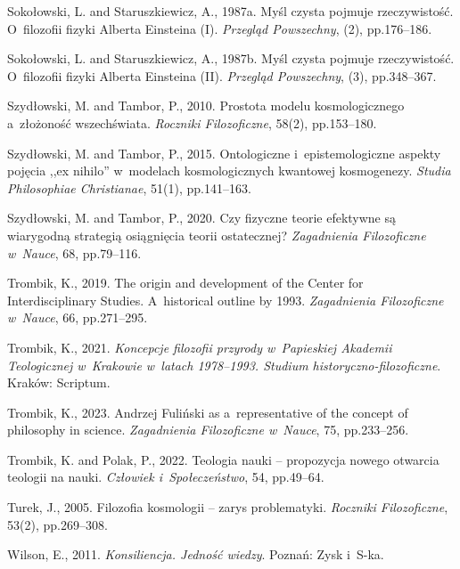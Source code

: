 Sokołowski, L. and Staruszkiewicz, A., 1987a. Myśl czysta pojmuje rzeczywistość. O~filozofii fizyki Alberta Einsteina (I). \textit{Przegląd Powszechny}, (2), pp.176–186.



Sokołowski, L. and Staruszkiewicz, A., 1987b. Myśl czysta pojmuje rzeczywistość. O~filozofii fizyki Alberta Einsteina (II). \textit{Przegląd Powszechny}, (3), pp.348–367.



Szydłowski, M. and Tambor, P., 2010. Prostota modelu kosmologicznego a~złożoność wszechświata. \textit{Roczniki Filozoficzne}, 58(2), pp.153–180.



Szydłowski, M. and Tambor, P., 2015. Ontologiczne i~epistemologiczne aspekty pojęcia ,,ex nihilo'' w~modelach kosmologicznych kwantowej kosmogenezy. \textit{Studia Philosophiae Christianae}, 51(1), pp.141–163.



Szydłowski, M. and Tambor, P., 2020. Czy fizyczne teorie efektywne są wiarygodną strategią osiągnięcia teorii ostatecznej? \textit{Zagadnienia Filozoficzne w~Nauce}, 68, pp.79–116.



Trombik, K., 2019. The origin and development of the Center for Interdisciplinary Studies. A~historical outline by 1993. \textit{Zagadnienia Filozoficzne w~Nauce}, 66, pp.271–295.



Trombik, K., 2021. \textit{Koncepcje filozofii przyrody w~Papieskiej Akademii Teologicznej w~Krakowie w~latach 1978–1993. Studium historyczno-filozoficzne}. Kraków: Scriptum.



Trombik, K., 2023. Andrzej Fuliński as a~representative of the concept of philosophy in science. \textit{Zagadnienia Filozoficzne w~Nauce}, 75, pp.233–256.



Trombik, K. and Polak, P., 2022. Teologia nauki -- propozycja nowego otwarcia teologii na nauki. \textit{Człowiek i~Społeczeństwo}, 54, pp.49–64.



Turek, J., 2005. Filozofia kosmologii -- zarys problematyki. \textit{Roczniki Filozoficzne}, 53(2), pp.269–308.



Wilson, E., 2011. \textit{Konsiliencja. Jedność wiedzy}. Poznań: Zysk i~S-ka.



